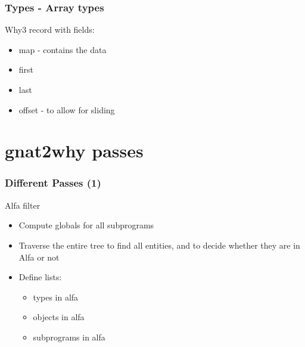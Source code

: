 \documentclass{beamer}
\newenvironment{specialframe}{%
  \begin{frame}[fragile,environment=specialframe]}{\end{frame}}
\begin{document}
\begin{specialframe}\frametitle{Types - Array types}
   \begin{block}{Why3 record with fields:}
      \begin{itemize}
         \item map - contains the data
         \item first
         \item last
         \item offset - to allow for sliding
      \end{itemize}
   \end{block}
\end{specialframe}

\section{gnat2why passes}

\begin{specialframe}\frametitle{Different Passes (1)}

   \begin{block}{Alfa filter}
      \begin{itemize}
         \item Compute globals for all subprograms
         \item Traverse the entire tree to find all entities, and to decide
            whether they are in Alfa or not
         \item Define lists:
            \begin{itemize}
                  \item types in alfa
                  \item objects in alfa
                  \item subprograms in alfa
            \end{itemize}
      \end{itemize}
   \end{block}
\end{specialframe}
\end{document}
